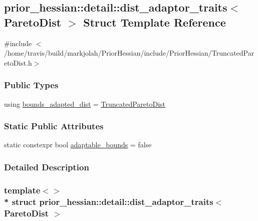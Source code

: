 \hypertarget{structprior__hessian_1_1detail_1_1dist__adaptor__traits_3_01ParetoDist_01_4}{}\subsection{prior\+\_\+hessian\+:\+:detail\+:\+:dist\+\_\+adaptor\+\_\+traits$<$ Pareto\+Dist $>$ Struct Template Reference}
\label{structprior__hessian_1_1detail_1_1dist__adaptor__traits_3_01ParetoDist_01_4}


{\ttfamily \#include $<$/home/travis/build/markjolah/\+Prior\+Hessian/include/\+Prior\+Hessian/\+Truncated\+Pareto\+Dist.\+h$>$}

\subsubsection*{Public Types}
\begin{DoxyCompactItemize}
\item 
using \hyperlink{structprior__hessian_1_1detail_1_1dist__adaptor__traits_3_01ParetoDist_01_4_ac747ebd8f37683894901b24971c2afc7}{bounds\+\_\+adapted\+\_\+dist} = \hyperlink{namespaceprior__hessian_afebdccc7e1a35836f660f8a301af9cb2}{Truncated\+Pareto\+Dist}
\end{DoxyCompactItemize}
\subsubsection*{Static Public Attributes}
\begin{DoxyCompactItemize}
\item 
static constexpr bool \hyperlink{structprior__hessian_1_1detail_1_1dist__adaptor__traits_3_01ParetoDist_01_4_a3537343291046bc190a3c9afde7043e0}{adaptable\+\_\+bounds} = false
\end{DoxyCompactItemize}


\subsubsection{Detailed Description}
\subsubsection*{template$<$$>$\\*
struct prior\+\_\+hessian\+::detail\+::dist\+\_\+adaptor\+\_\+traits$<$ Pareto\+Dist $>$}



